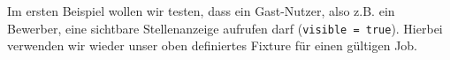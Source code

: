 Im ersten Beispiel wollen wir testen, dass ein Gast-Nutzer, also z.B. ein Bewerber, eine sichtbare Stellenanzeige aufrufen darf (\texttt{visible = true}). Hierbei verwenden wir wieder unser oben definiertes Fixture für einen gültigen Job.
%                                                                                                                                                                    
%                                                                                                                                                                    
%                                                                                                                                                                    
%                                                                                                                                                                    

